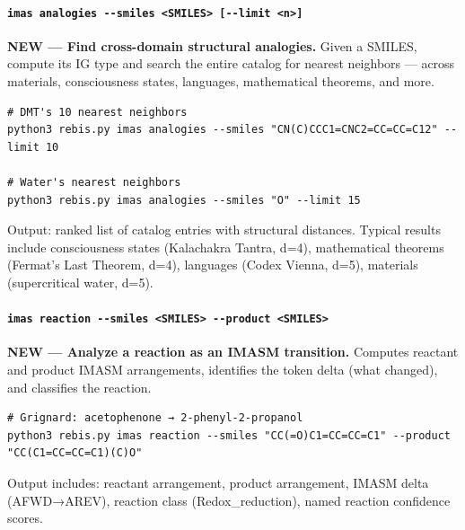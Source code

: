 \documentclass[12pt,a4paper]{article}
\begin{document}
\hypertarget{imas-analogies---smiles-smiles---limit-n}{%
\paragraph{\texorpdfstring{\texttt{imas\ analogies\ -\/-smiles\ \textless{}SMILES\textgreater{}\ {[}-\/-limit\ \textless{}n\textgreater{}{]}}}{imas analogies -\/-smiles \textless SMILES\textgreater{} {[}-\/-limit \textless n\textgreater{]}}}\label{imas-analogies---smiles-smiles---limit-n}}

\textbf{NEW --- Find cross-domain structural analogies.} Given a SMILES,
compute its IG type and search the entire catalog for nearest neighbors
--- across materials, consciousness states, languages, mathematical
theorems, and more.

\begin{verbatim}
# DMT's 10 nearest neighbors
python3 rebis.py imas analogies --smiles "CN(C)CCC1=CNC2=CC=CC=C12" --limit 10

# Water's nearest neighbors
python3 rebis.py imas analogies --smiles "O" --limit 15
\end{verbatim}

Output: ranked list of catalog entries with structural distances.
Typical results include consciousness states (Kalachakra Tantra, d=4),
mathematical theorems (Fermat's Last Theorem, d=4), languages (Codex
Vienna, d=5), materials (supercritical water, d=5).

\hypertarget{imas-reaction---smiles-smiles---product-smiles}{%
\paragraph{\texorpdfstring{\texttt{imas\ reaction\ -\/-smiles\ \textless{}SMILES\textgreater{}\ -\/-product\ \textless{}SMILES\textgreater{}}}{imas reaction -\/-smiles \textless SMILES\textgreater{} -\/-product \textless SMILES\textgreater{}}}\label{imas-reaction---smiles-smiles---product-smiles}}

\textbf{NEW --- Analyze a reaction as an IMASM transition.} Computes
reactant and product IMASM arrangements, identifies the token delta
(what changed), and classifies the reaction.

\begin{verbatim}
# Grignard: acetophenone → 2-phenyl-2-propanol
python3 rebis.py imas reaction --smiles "CC(=O)C1=CC=CC=C1" --product "CC(C1=CC=CC=C1)(C)O"
\end{verbatim}

Output includes: reactant arrangement, product arrangement, IMASM delta
(AFWD→AREV), reaction class (Redox\_reduction), named reaction
confidence scores.
\end{document}
